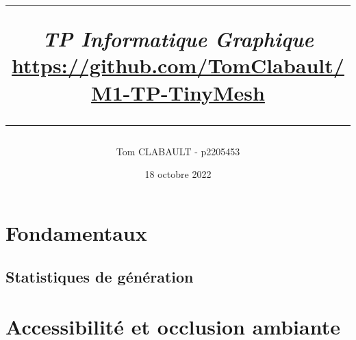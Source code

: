 \documentclass[11pt]{article}
\author{Tom CLABAULT - p2205453\\}
\title{
\noindent\rule{\textwidth}{1pt}
\textit{\textbf{TP Informatique Graphique}}\\
{\small \textcolor{blue}{\href{https://github.com/TomClabault/M1-TP-TinyMesh}{https://github.com/TomClabault/M1-TP-TinyMesh}}}
\noindent\rule{\textwidth}{1pt}
\vskip 1cm
}
\date{18 octobre 2022\\}
\begin{document}
\maketitle

\section{Fondamentaux}
        	

	\subsection {Statistiques de génération}
		

\section {Accessibilité et occlusion ambiante}
\end{document}
